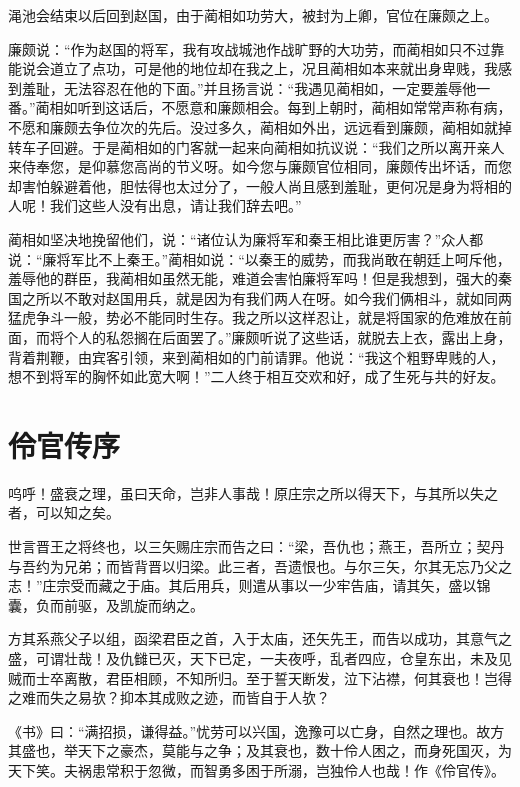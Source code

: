 \documentclass[12pt,UTF-8,openany]{ctexbook}
\begin{document}
\begin{normalsize}
    渑池会结束以后回到赵国，由于蔺相如功劳大，被封为上卿，官位在廉颇之上。
    
    廉颇说：“作为赵国的将军，我有攻战城池作战旷野的大功劳，而蔺相如只不过靠能说会道立了点功，可是他的地位却在我之上，况且蔺相如本来就出身卑贱，我感到羞耻，无法容忍在他的下面。”并且扬言说：“我遇见蔺相如，一定要羞辱他一番。”蔺相如听到这话后，不愿意和廉颇相会。每到上朝时，蔺相如常常声称有病，不愿和廉颇去争位次的先后。没过多久，蔺相如外出，远远看到廉颇，蔺相如就掉转车子回避。于是蔺相如的门客就一起来向蔺相如抗议说：“我们之所以离开亲人来侍奉您，是仰慕您高尚的节义呀。如今您与廉颇官位相同，廉颇传出坏话，而您却害怕躲避着他，胆怯得也太过分了，一般人尚且感到羞耻，更何况是身为将相的人呢！我们这些人没有出息，请让我们辞去吧。”
    
    蔺相如坚决地挽留他们，说：“诸位认为廉将军和秦王相比谁更厉害？”众人都说：“廉将军比不上秦王。”蔺相如说：“以秦王的威势，而我尚敢在朝廷上呵斥他，羞辱他的群臣，我蔺相如虽然无能，难道会害怕廉将军吗！但是我想到，强大的秦国之所以不敢对赵国用兵，就是因为有我们两人在呀。如今我们俩相斗，就如同两猛虎争斗一般，势必不能同时生存。我之所以这样忍让，就是将国家的危难放在前面，而将个人的私怨搁在后面罢了。”廉颇听说了这些话，就脱去上衣，露出上身，背着荆鞭，由宾客引领，来到蔺相如的门前请罪。他说：“我这个粗野卑贱的人，想不到将军的胸怀如此宽大啊！”二人终于相互交欢和好，成了生死与共的好友。
    
\end{normalsize}



\chapter{伶官传序}

\begin{normalsize}
    
    呜呼！盛衰之理，虽曰天命，岂非人事哉！原庄宗之所以得天下，与其所以失之者，可以知之矣。
    
    世言晋王之将终也，以三矢赐庄宗而告之曰：“梁，吾仇也；燕王，吾所立；契丹与吾约为兄弟；而皆背晋以归梁。此三者，吾遗恨也。与尔三矢，尔其无忘乃父之志！”庄宗受而藏之于庙。其后用兵，则遣从事以一少牢告庙，请其矢，盛以锦囊，负而前驱，及凯旋而纳之。
    
    方其系燕父子以组，函梁君臣之首，入于太庙，还矢先王，而告以成功，其意气之盛，可谓壮哉！及仇雠已灭，天下已定，一夫夜呼，乱者四应，仓皇东出，未及见贼而士卒离散，君臣相顾，不知所归。至于誓天断发，泣下沾襟，何其衰也！岂得之难而失之易欤？抑本其成败之迹，而皆自于人欤？
    
    《书》曰：“满招损，谦得益。”忧劳可以兴国，逸豫可以亡身，自然之理也。故方其盛也，举天下之豪杰，莫能与之争；及其衰也，数十伶人困之，而身死国灭，为天下笑。夫祸患常积于忽微，而智勇多困于所溺，岂独伶人也哉！作《伶官传》。
\end{normalsize}
\end{document}
